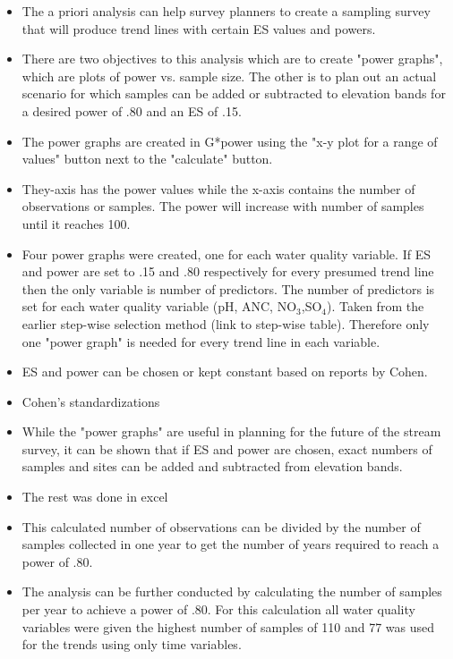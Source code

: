 \begin{itemize}
	\item The a priori analysis can help survey planners to create a sampling survey that will produce trend lines with certain ES values and powers.
	\item There are two objectives to this analysis which are to create "power graphs", which are plots of power vs. sample size.  The other is to plan out an actual scenario for which samples can be added or subtracted to elevation bands for a desired power of .80 and an ES of .15.
	\item The power graphs are created in G*power using the "x-y plot for a range of values" button next to the "calculate" button.
	\item They-axis has the power values while the x-axis contains the number of observations or samples.  The power will increase with number of samples until it reaches 100.
	\item Four power graphs were created, one for each water quality variable.  If ES and power are set to .15 and .80 respectively for every presumed trend line then the only variable is number of predictors.  The number of predictors is set for each water quality variable (pH, ANC, NO$_3$,SO$_4$).  Taken from the earlier step-wise selection method (link to step-wise table).  Therefore only one "power graph" is needed for every trend line in each variable.
	\item ES and power can be chosen or kept constant based on reports by Cohen.
	\item Cohen's standardizations
	\item While the "power graphs" are useful in planning for the future of the stream survey, it can be shown that if ES and power are chosen, exact numbers of samples and sites can be added and subtracted from elevation bands.
	\item The rest was done in excel
	\item This calculated number of observations can be divided by the number of samples collected in one year to get the number of years required to reach a power of .80.
	\item The analysis can be further conducted by calculating the number of samples per year to achieve a power of .80.  For this calculation all water quality variables were given the highest number of samples of 110 and 77 was used for the trends using only time variables.

\end{itemize}
